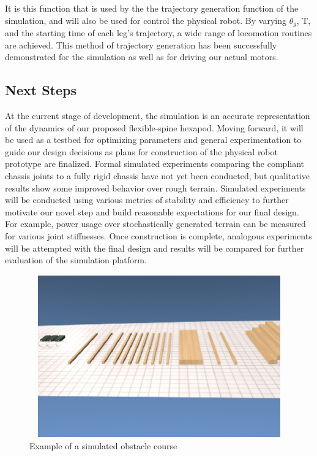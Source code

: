 \documentclass[11pt]{article}
\begin{document}
It is this function that is used by the the trajectory generation function of the simulation, and will also be used for control the physical robot. By varying \(\theta _g\), T, and the starting time of each leg's trajectory, a wide range of locomotion routines are achieved. This method of trajectory generation has been successfully demonstrated for the simulation as well as for driving our actual motors.

\subsection{Next Steps}

At the current stage of development, the simulation is an accurate representation of the dynamics of our proposed flexible-spine hexapod. Moving forward, it will be used as a testbed for optimizing parameters and general experimentation to guide our design decisions as plans for construction of the physical robot prototype are finalized. Formal simulated experiments comparing the compliant chassis joints to a fully rigid chassis have not yet been conducted, but qualitative results show some improved behavior over rough terrain. Simulated experiments will be conducted using various metrics of stability and efficiency to further motivate our novel step and build reasonable expectations for our final design. For example, power usage over stochastically generated terrain can be measured for various joint stiffnesses. Once construction is complete, analogous experiments will be attempted with the final design and results will be compared for further evaluation of the simulation platform.

\begin{figure}[H]
\centering
\includegraphics[width=12cm,height=7cm]{report_gr3.eps}
\caption{Example of a simulated obstacle course}
\end{figure}
\end{document}
